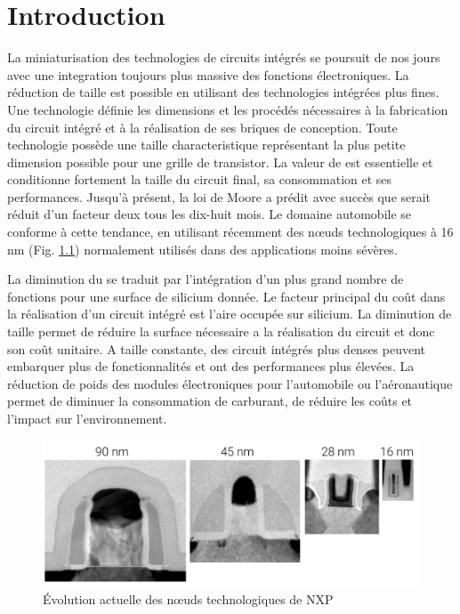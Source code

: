 \chapter{Introduction}

La miniaturisation des technologies de circuits intégrés se poursuit de nos jours avec une integration toujours plus massive des fonctions électroniques.
La réduction de taille est possible en utilisant des technologies intégrées plus fines.
Une technologie définie les dimensions et les procédés nécessaires à la fabrication du circuit intégré et à la réalisation de ses briques de conception.
Toute technologie possède une taille characteristique \textlambda{} représentant la plus petite dimension possible pour une grille de transistor.
La valeur de \textlambda{} est essentielle et conditionne fortement la taille du circuit final, sa consommation et ses performances.
Jusqu'à présent, la loi de Moore a prédit avec succès que \textlambda{} serait réduit d'un facteur deux tous les dix-huit mois.
Le domaine automobile se conforme à cette tendance, en utilisant récemment des nœuds technologiques à 16 nm (Fig. \ref{fig:nxp-techno-increase}) \cite{evolution_technologies} normalement utilisés dans des applications moins sévères.

La diminution du \textlambda{} se traduit par l'intégration d'un plus grand nombre de fonctions pour une surface de silicium donnée.
Le facteur principal du coût dans la réalisation d'un circuit intégré est l'aire occupée sur silicium.
La diminution de taille permet de réduire la surface nécessaire a la réalisation du circuit et donc son coût unitaire.
A taille constante, des circuit intégrés plus denses peuvent embarquer plus de fonctionnalités et ont des performances plus élevées.
La réduction de poids des modules électroniques pour l'automobile ou l'aéronautique permet de diminuer la consommation de carburant, de réduire les coûts et l'impact sur l'environnement.

\begin{figure}[!h]
  \centering
  \includegraphics[width=\textwidth]{src/1/figures/technology_evolution.pdf}
  \caption{Évolution actuelle des nœuds technologiques de NXP \cite{evolution_technologies}}
  \label{fig:nxp-techno-increase}
\end{figure}

